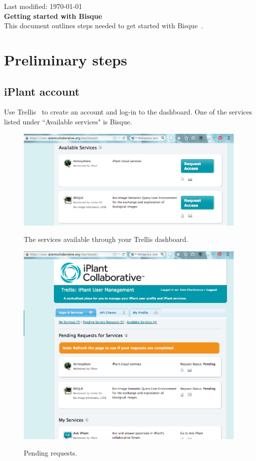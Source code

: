 \documentclass[12pt]{article}
\begin{document}

\hfill Last modified: \today \\%

\noindent
{\Large \bf Getting started with Bisque}\\ 

This document outlines steps needed to get started with Bisque~\cite{Bisque}.

\section{Preliminary steps}
\label{sec:Preliminary}
\subsection{iPlant account}
\label{sec:iPlant_account}

Use Trellis~\cite{Trellis}
to create an account and log-in to the dashboard.
One of the services listed under ``Available services" is Bisque.

\begin{figure}[h]
\centering
  \includegraphics[width=0.6\linewidth]{./figures/available_services.png}
  \label{fig:available_services}
  \caption{The services available through your Trellis dashboard.}
\end{figure}

\begin{figure}[h]
\centering
  \includegraphics[width=0.6\linewidth]{./figures/pending_request.png}
  \label{fig:pending_request}
  \caption{Pending requests.}
\end{figure}
\end{document}
